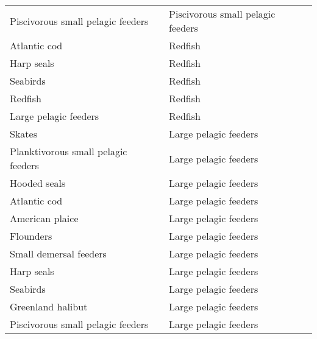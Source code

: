 \begin{table}[h!]
\begin{tabular}{|l|l|}
      Piscivorous small pelagic feeders   & Piscivorous small pelagic feeders \\
      Atlantic cod                        & Redfish   \\
      Harp seals                          & Redfish   \\
      Seabirds                            & Redfish   \\
      Redfish                             & Redfish   \\
      Large pelagic feeders               & Redfish   \\
      Skates                              & Large pelagic feeders \\
      Planktivorous small pelagic feeders & Large pelagic feeders \\
      Hooded seals                        & Large pelagic feeders \\
      Atlantic cod                        & Large pelagic feeders \\
      American plaice                     & Large pelagic feeders \\
      Flounders                           & Large pelagic feeders \\
      Small demersal feeders              & Large pelagic feeders \\
      Harp seals                          & Large pelagic feeders \\
      Seabirds                            & Large pelagic feeders \\
      Greenland halibut                   & Large pelagic feeders \\
      Piscivorous small pelagic feeders   & Large pelagic feeders \\
      \hline
    \end{tabular}
\end{table}
\newpage
